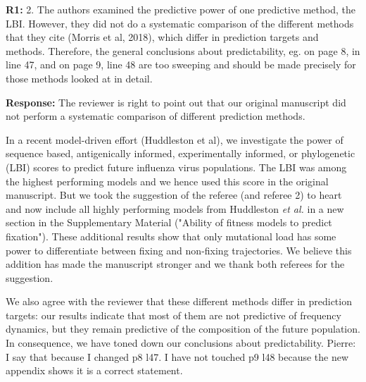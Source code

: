 \documentclass[aps,rmp,onecolumn]{revtex4-1}
\newcommand{\pierre}[1]{{\color{red}Pierre: #1}}
\newcommand{\refa}[1]{\textbf{R1:} #1\vskip 5mm}
\newcommand{\response}[1]{{\it {\color{response}\textbf{Response:} #1}}\vskip 5mm}
\begin{document}

\refa{2. The authors examined the predictive power of one predictive
method, the LBI. However, they did not do a systematic comparison of
the different methods that they cite (Morris et al, 2018), which differ in prediction
targets and methods. Therefore, the general conclusions about
predictability, eg. on page 8, in line 47, and on page 9, line 48 are
too sweeping and should be made precisely for those methods looked at
in detail.}

\response{The reviewer is right to point out that our original manuscript did not perform a systematic comparison of different prediction methods. 

In a recent model-driven effort (Huddleston et al), we investigate the power of sequence based, antigenically informed, experimentally informed, or phylogenetic (LBI) scores to predict future influenza virus populations.
The LBI was among the highest performing models and we hence used this score in the original manuscript.
But we took the suggestion of the referee (and referee 2) to heart and now include all highly performing models from Huddleston \emph{et al.} in a new section in the Supplementary Material ("Ability of fitness models to predict fixation"). 
These additional results show that only mutational load has some power to differentiate between fixing and non-fixing trajectories.
We believe this addition has made the manuscript stronger and we thank both referees for the suggestion.

We also agree with the reviewer that these different methods differ in prediction targets: our results indicate that most of them are not predictive of frequency dynamics, but they remain predictive of the composition of the future population. 
In consequence, we have toned down our conclusions about predictability. \pierre{I say that because I changed p8 l47. I have not touched p9 l48 because the new appendix shows it is a correct statement.}
}
\end{document}
